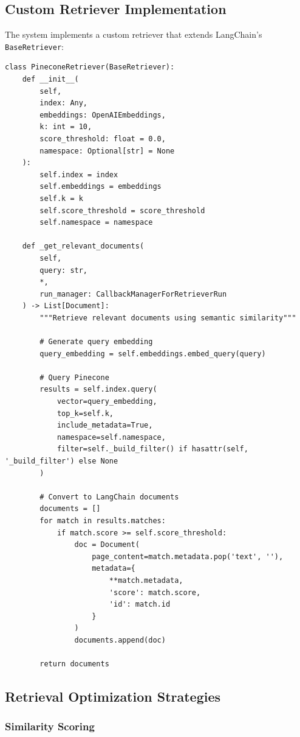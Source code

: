 \documentclass[12pt,a4paper]{article}
\begin{document}
\subsection{Custom Retriever Implementation}

The system implements a custom retriever that extends LangChain's \texttt{BaseRetriever}:

\begin{lstlisting}[caption=Custom Pinecone Retriever]
class PineconeRetriever(BaseRetriever):
    def __init__(
        self,
        index: Any,
        embeddings: OpenAIEmbeddings,
        k: int = 10,
        score_threshold: float = 0.0,
        namespace: Optional[str] = None
    ):
        self.index = index
        self.embeddings = embeddings
        self.k = k
        self.score_threshold = score_threshold
        self.namespace = namespace
    
    def _get_relevant_documents(
        self,
        query: str,
        *,
        run_manager: CallbackManagerForRetrieverRun
    ) -> List[Document]:
        """Retrieve relevant documents using semantic similarity"""
        
        # Generate query embedding
        query_embedding = self.embeddings.embed_query(query)
        
        # Query Pinecone
        results = self.index.query(
            vector=query_embedding,
            top_k=self.k,
            include_metadata=True,
            namespace=self.namespace,
            filter=self._build_filter() if hasattr(self, '_build_filter') else None
        )
        
        # Convert to LangChain documents
        documents = []
        for match in results.matches:
            if match.score >= self.score_threshold:
                doc = Document(
                    page_content=match.metadata.pop('text', ''),
                    metadata={
                        **match.metadata,
                        'score': match.score,
                        'id': match.id
                    }
                )
                documents.append(doc)
        
        return documents
\end{lstlisting}

\subsection{Retrieval Optimization Strategies}

\subsubsection{Similarity Scoring}
\end{document}
